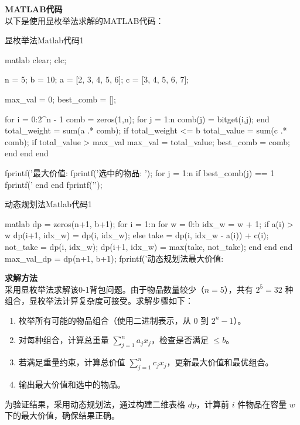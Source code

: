 \textbf{MATLAB代码}\\
以下是使用显枚举法求解的MATLAB代码：

\begin{codebox}{显枚举法Matlab代码}{1}
\begin{amzcode}{matlab}
clear; clc;

n = 5; %
b = 10; %
a = [2, 3, 4, 5, 6]; %
c = [3, 4, 5, 6, 7]; %

max_val = 0; %
best_comb = []; %

for i = 0:2^n - 1
    comb = zeros(1,n); %
    for j = 1:n
        comb(j) = bitget(i,j); %
    end
    total_weight = sum(a .* comb); %
    if total_weight <= b %
        total_value = sum(c .* comb); %
        if total_value > max_val %
            max_val = total_value;
            best_comb = comb;
        end
    end
end

fprintf('最大价值: %
fprintf('选中的物品: ');
for j = 1:n
    if best_comb(j) == 1
        fprintf('%
    end
end
fprintf('\n');
\end{amzcode}
\end{codebox}

\begin{codebox}{动态规划法Matlab代码}{1}
	\begin{amzcode}{matlab}
dp = zeros(n+1, b+1); %
for i = 1:n
    for w = 0:b
        idx_w = w + 1; %
        if a(i) > w
            dp(i+1, idx_w) = dp(i, idx_w); %
        else
            take = dp(i, idx_w - a(i)) + c(i); %
            not_take = dp(i, idx_w); %
            dp(i+1, idx_w) = max(take, not_take); %
        end
    end
end
max_val_dp = dp(n+1, b+1); %
fprintf('动态规划法最大价值: %
\end{amzcode}
\end{codebox}

\textbf{求解方法}\\
采用显枚举法求解该0-1背包问题。由于物品数量较少（\( n = 5 \)），共有 \( 2^5 = 32 \) 种组合，显枚举法计算复杂度可接受。求解步骤如下：
\begin{enumerate}
    \item 枚举所有可能的物品组合（使用二进制表示，从 \( 0 \) 到 \( 2^n - 1 \)）。
    \item 对每种组合，计算总重量 \( \sum_{j=1}^n a_j x_j \)，检查是否满足 \( \leq b \)。
    \item 若满足重量约束，计算总价值 \( \sum_{j=1}^n c_j x_j \)，更新最大价值和最优组合。
    \item 输出最大价值和选中的物品。
\end{enumerate}
为验证结果，采用动态规划法，通过构建二维表格 \( dp \)，计算前 \( i \) 件物品在容量 \( w \) 下的最大价值，确保结果正确。

